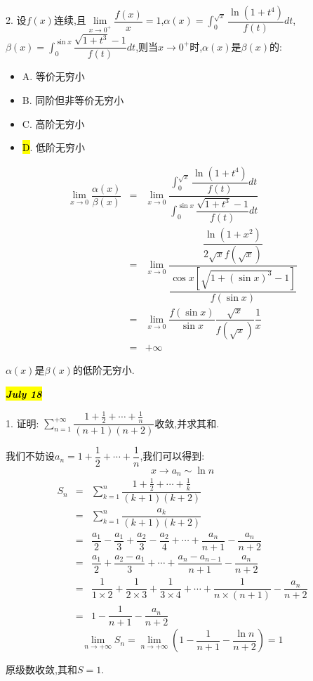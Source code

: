 2. 设$f(x)$连续,且$\lim\limits_{x\rightarrow 0^{+}}\dfrac{f(x)}{x}=1$,$\alpha(x)=\int_{0}^{\sqrt{x}}\dfrac{\ln(1+t^4)}{f(t)}dt$,$\beta(x)=\int_{0}^{\sin x}\dfrac{\sqrt{1+t^3}-1}{f(t)}dt$,则当$x\rightarrow 0^{+}$时,$\alpha(x)$是$\beta(x)$的: 
\begin{itemize}
	\item A. 等价无穷小
	\item B. 同阶但非等价无穷小
	\item C. 高阶无穷小
	\item \hl{D}. 低阶无穷小
\end{itemize}
\begin{solution}
	\begin{eqnarray*}
		\lim\limits_{x\rightarrow 0}\dfrac{\alpha(x)}{\beta(x)}&=&\lim\limits_{x\rightarrow 0}\dfrac{\int_{0}^{\sqrt{x}}\dfrac{\ln(1+t^4)}{f(t)}dt}{\int_{0}^{\sin x}\dfrac{\sqrt{1+t^3}-1}{f(t)}dt}\\
		&=&\lim\limits_{x\rightarrow 0}\dfrac{\dfrac{\ln(1+x^2)}{2\sqrt{x}f(\sqrt{x})}}{\dfrac{\cos x[\sqrt{1+(\sin x)^3}-1]}{f(\sin x)}}\\
		&=&\lim\limits_{x\rightarrow 0}\dfrac{f(\sin x)}{\sin x}\dfrac{\sqrt{x}}{f(\sqrt{x})}\dfrac{1}{x}\\
		&=&+\infty
	\end{eqnarray*}
	
	$\alpha(x)$是$\beta(x)$的低阶无穷小.
\end{solution}

\hl{\textbf{\textit{July 18}}}

1. 证明: $\sum\limits_{n=1}^{+\infty}\dfrac{1+\frac{1}{2}+\cdots+\frac{1}{n}}{(n+1)(n+2)}$收敛,并求其和.
\begin{solution}
	
	我们不妨设$a_{n}=1+\dfrac{1}{2}+\cdots+\dfrac{1}{n}$,我们可以得到: 
	$$x\rightarrow a_{n}\sim \ln n$$
	\begin{eqnarray*}
		S_{n}&=&\sum\limits_{k=1}^{n}\dfrac{1+\frac{1}{2}+\cdots+\frac{1}{k}}{(k+1)(k+2)}\\
		&=&\sum\limits_{k=1}^{n}\dfrac{a_{k}}{(k+1)(k+2)}\\
		&=&\dfrac{a_{1}}{2}-\dfrac{a_{1}}{3}+\dfrac{a_{2}}{3}-\dfrac{a_{2}}{4}+\cdots+\dfrac{a_{n}}{n+1}-\dfrac{a_{n}}{n+2}\\
		&=&\dfrac{a_{1}}{2}+\dfrac{a_{2}-a_{1}}{3}+\cdots+\dfrac{a_{n}-a_{n-1}}{n+1}-\dfrac{a_{n}}{n+2}\\
		&=&\dfrac{1}{1\times 2}+\dfrac{1}{2\times 3}+\dfrac{1}{3\times 4}+\cdots+\dfrac{1}{n\times (n+1)}-\dfrac{a_{n}}{n+2}\\
		&=&1-\dfrac{1}{n+1}-\dfrac{a_{n}}{n+2}
	\end{eqnarray*}
	$$\lim\limits_{n\rightarrow+\infty}S_{n}=\lim\limits_{n\rightarrow+\infty}(1-\dfrac{1}{n+1}-\dfrac{\ln n}{n+2})=1$$
	
	原级数收敛,其和$S=1$.
\end{solution}

